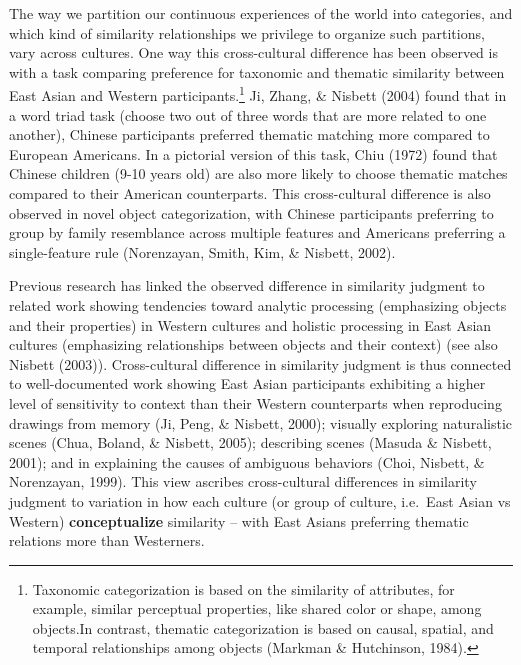 \documentclass[10pt, letterpaper]{article}
\begin{document}
The way we partition our continuous experiences of the world into
categories, and which kind of similarity relationships we privilege to
organize such partitions, vary across cultures. One way this
cross-cultural difference has been observed is with a task comparing
preference for taxonomic and thematic similarity between East Asian and
Western participants.\footnote{Taxonomic categorization is based on the
  similarity of attributes, for example, similar perceptual properties,
  like shared color or shape, among objects.In contrast, thematic
  categorization is based on causal, spatial, and temporal relationships
  among objects (Markman \& Hutchinson, 1984).} Ji, Zhang, \& Nisbett
(2004) found that in a word triad task (choose two out of three words
that are more related to one another), Chinese participants preferred
thematic matching more compared to European Americans. In a pictorial
version of this task, Chiu (1972) found that Chinese children (9-10
years old) are also more likely to choose thematic matches compared to
their American counterparts. This cross-cultural difference is also
observed in novel object categorization, with Chinese participants
preferring to group by family resemblance across multiple features and
Americans preferring a single-feature rule (Norenzayan, Smith, Kim, \&
Nisbett, 2002).

Previous research has linked the observed difference in similarity
judgment to related work showing tendencies toward analytic processing
(emphasizing objects and their properties) in Western cultures and
holistic processing in East Asian cultures (emphasizing relationships
between objects and their context) (see also Nisbett (2003)).
Cross-cultural difference in similarity judgment is thus connected to
well-documented work showing East Asian participants exhibiting a higher
level of sensitivity to context than their Western counterparts when
reproducing drawings from memory (Ji, Peng, \& Nisbett, 2000); visually
exploring naturalistic scenes (Chua, Boland, \& Nisbett, 2005);
describing scenes (Masuda \& Nisbett, 2001); and in explaining the
causes of ambiguous behaviors (Choi, Nisbett, \& Norenzayan, 1999). This
view ascribes cross-cultural differences in similarity judgment to
variation in how each culture (or group of culture, i.e.~East Asian vs
Western) \textbf{conceptualize} similarity -- with East Asians
preferring thematic relations more than Westerners.
\end{document}
